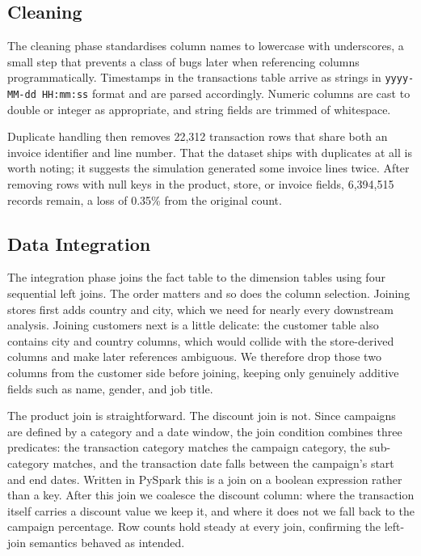 \documentclass[11pt,a4paper]{article}
\begin{document}
\subsection{Cleaning}

The cleaning phase standardises column names to lowercase with underscores, a small step that prevents a class of bugs later when referencing columns programmatically. Timestamps in the transactions table arrive as strings in \texttt{yyyy-MM-dd HH:mm:ss} format and are parsed accordingly. Numeric columns are cast to double or integer as appropriate, and string fields are trimmed of whitespace.

Duplicate handling then removes 22{,}312 transaction rows that share both an invoice identifier and line number. That the dataset ships with duplicates at all is worth noting; it suggests the simulation generated some invoice lines twice. After removing rows with null keys in the product, store, or invoice fields, 6,394,515 records remain, a loss of 0.35\% from the original count.

\subsection{Data Integration}\label{sec:integration}

The integration phase joins the fact table to the dimension tables using four sequential left joins. The order matters and so does the column selection. Joining stores first adds country and city, which we need for nearly every downstream analysis. Joining customers next is a little delicate: the customer table also contains city and country columns, which would collide with the store-derived columns and make later references ambiguous. We therefore drop those two columns from the customer side before joining, keeping only genuinely additive fields such as name, gender, and job title.

The product join is straightforward. The discount join is not. Since campaigns are defined by a category and a date window, the join condition combines three predicates: the transaction category matches the campaign category, the sub-category matches, and the transaction date falls between the campaign's start and end dates. Written in PySpark this is a join on a boolean expression rather than a key. After this join we coalesce the discount column: where the transaction itself carries a discount value we keep it, and where it does not we fall back to the campaign percentage. Row counts hold steady at every join, confirming the left-join semantics behaved as intended.
\end{document}
